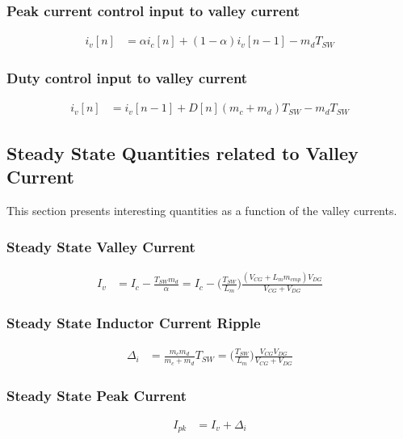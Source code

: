 \documentclass{scrartcl}
\begin{document}
		\subsubsection{Peak current control input to valley current}
			\begin{align}
			i_v[n] &=  \alpha i_c[n] + ( 1 - \alpha ) i_v [n-1] - m_dT_{SW}    \label{ivn_cpm}
			\end{align}
		
		\subsubsection{Duty control input to valley current}
			\begin{align}
			i_v[n] &= i_v[n-1] +  D[n](m_c+m_d)T_{SW} - m_dT_{SW}  \label{ivn_dc}	
			\end{align}		
		

	\subsection{Steady State Quantities related to Valley Current}
	This section presents interesting quantities as a function of the valley currents.
	
		\subsubsection{Steady State Valley Current}
			\begin{align}
			I_{v} &=  I_{c} - \frac{T_{SW}m_d} {\alpha} =
			I_c - \bigg(\frac{T_{SW}} {L_m}\bigg) \frac{(V_{CG}+L_m m_{cmp})V_{DG} }{V_{CG}+V_{DG}} \label{ic_to_iv}
			\end{align}
			
		\subsubsection{Steady State Inductor Current Ripple}
			\begin{align}
			\Delta_i &=  \frac{m_c m_d}{m_c + m_d} T_{SW} = \bigg(\frac{T_{SW}} {L_m}\bigg)\frac{V_{CG} V_{DG}}{V_{CG} + V_{DG}}
			\end{align}	
	
		\subsubsection{Steady State Peak Current}
			\begin{align}
			I_{pk} &=  I_v + \Delta_i \label{ripple}
			\end{align}	
		
\end{document}
